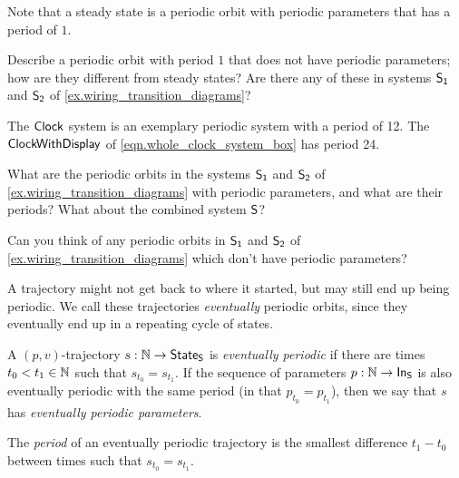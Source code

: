 \documentclass[DynamicalBook]{subfiles}
\begin{document}
\begin{remark}
  Note that a steady state is a periodic orbit with periodic parameters that has
  a period of $1$. 
\end{remark}

\begin{exercise}
Describe a periodic orbit with period $1$ that does not have periodic
parameters; how are they different from steady states? Are there any of these in systems $\mathsf{S_1}$ and $\mathsf{S_2}$ of \cref{ex.wiring_transition_diagrams}?
\end{exercise}

\begin{example}
  The $\mathsf{Clock}$ system is an exemplary periodic system with a period of 12.
  The $\mathsf{ClockWithDisplay}$ of \cref{eqn.whole_clock_system_box} has period 24.
\end{example}

\begin{exercise}\label{ex.wiring_transition_diagrams_periodic_orbits}
  What are the periodic orbits in the systems $\mathsf{S_1}$ and $\mathsf{S_2}$ of
  \cref{ex.wiring_transition_diagrams} with periodic parameters, and what are their periods? What about
  the combined system $\mathsf{S}$?
\end{exercise}

\begin{exercise}\label{ex.wiring_transition_diagrams_periodic_parameters}
  Can you think of any periodic orbits in $\mathsf{S_1}$ and $\mathsf{S_2}$ of
  \cref{ex.wiring_transition_diagrams} which
  don't have periodic parameters? 
\end{exercise}

A trajectory might not get back to where it started, but may still end up being
periodic. We call these trajectories \emph{eventually} periodic orbits, since
they eventually end up in a repeating cycle of states.

\begin{definition} \label{def.eventually_periodic_orbit_discrete}
A $(p, v)$-trajectory $s : \mathbb{N} \to
  \mathsf{State}_{\mathsf{S}}$ is \emph{eventually periodic} if there are times $t_0 < t_1 \in
  \mathbb{N}$ such that $s_{t_0} = s_{t_1}$. If the sequence of
  parameters $p : \mathbb{N} \to \mathsf{In}_{\mathsf{S}}$ is also eventually periodic with the same period (in that $p_{t_0} = p_{t_1}$), then we say that $s$ has \emph{eventually periodic parameters}.

The \emph{period} of an eventually periodic trajectory is
  the smallest difference $t_1 - t_0$ between times such that $s_{t_0} = s_{t_1}$.
\end{definition}
\end{document}
